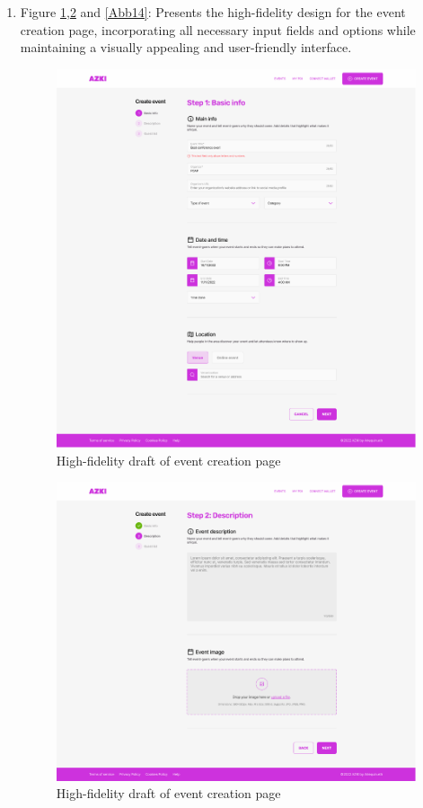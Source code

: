 \begin{enumerate}
\item Figure \ref{Abb12},\ref{Abb13} and \ref{Abb14}: Presents the high-fidelity design for the event creation page, incorporating all necessary input fields and options while maintaining a visually appealing and user-friendly interface.\\
\begin{figure}[H]
\centering
\includegraphics[width=0.8\linewidth]{PICs/HiFiEventCreation.png}
\caption{High-fidelity draft of event creation page}\label{Abb12}
\end{figure}

\begin{figure}[H]
\centering
\includegraphics[width=0.8\linewidth]{PICs/HiFiEventCreation2.png}
\caption{High-fidelity draft of event creation page}\label{Abb13}
\end{figure}



\end{enumerate}
